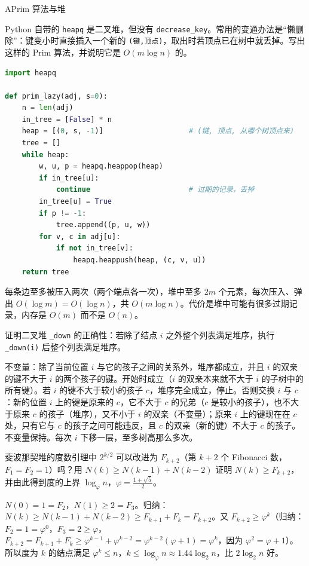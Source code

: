 \begin{exercises}{A}{Prim 算法与堆}
\item\label{ex:mst-prim:A1} Python 自带的 \texttt{heapq} 是二叉堆，但没有 \texttt{decrease\_key}。常用的变通办法是“懒删除”：键变小时直接插入一个新的 \texttt{(键,顶点)}，取出时若顶点已在树中就丢掉。写出这样的 Prim 算法，并说明它是 $O(m\log n)$ 的。
\begin{solution}
\begin{lstlisting}[language=Python]
import heapq

def prim_lazy(adj, s=0):
    n = len(adj)
    in_tree = [False] * n
    heap = [(0, s, -1)]                    # (键, 顶点, 从哪个树顶点来)
    tree = []
    while heap:
        w, u, p = heapq.heappop(heap)
        if in_tree[u]:
            continue                       # 过期的记录，丢掉
        in_tree[u] = True
        if p != -1:
            tree.append((p, u, w))
        for v, c in adj[u]:
            if not in_tree[v]:
                heapq.heappush(heap, (c, v, u))
    return tree
\end{lstlisting}
每条边至多被压入两次（两个端点各一次），堆中至多 $2m$ 个元素，每次压入、弹出 $O(\log m)=O(\log n)$，共 $O(m\log n)$。代价是堆中可能有很多过期记录，内存是 $O(m)$ 而不是 $O(n)$。
\end{solution}

\item\label{ex:mst-prim:A2} 证明二叉堆 \texttt{\_down} 的正确性：若除了结点 $i$ 之外整个列表满足堆序，执行 \texttt{\_down(i)} 后整个列表满足堆序。
\begin{solution}
不变量：除了当前位置 $i$ 与它的孩子之间的关系外，堆序都成立，并且 $i$ 的双亲的键不大于 $i$ 的两个孩子的键。开始时成立（$i$ 的双亲本来就不大于 $i$ 的子树中的所有键）。若 $i$ 的键不大于较小的孩子 $c$，堆序完全成立，停止。否则交换 $i$ 与 $c$：新的位置 $i$ 上的键是原来的 $c$，它不大于 $c$ 的兄弟（$c$ 是较小的孩子），也不大于原来 $c$ 的孩子（堆序），又不小于 $i$ 的双亲（不变量）；原来 $i$ 上的键现在在 $c$ 处，只有它与 $c$ 的孩子之间可能违反，且 $c$ 的双亲（新的键）不大于 $c$ 的孩子。不变量保持。每次 $i$ 下移一层，至多树高那么多次。
\end{solution}

\item\label{ex:mst-prim:A3} 斐波那契堆的度数引理中 $2^{k/2}$ 可以改进为 $F_{k+2}$（第 $k+2$ 个 Fibonacci 数，$F_1=F_2=1$）吗？用 $N(k)\geqslant N(k-1)+N(k-2)$ 证明 $N(k)\geqslant F_{k+2}$，并由此得到度的上界 $\log_\varphi n$，$\varphi=\frac{1+\sqrt5}2$。
\begin{solution}
$N(0)=1=F_2$，$N(1)\geqslant2=F_3$。归纳：$N(k)\geqslant N(k-1)+N(k-2)\geqslant F_{k+1}+F_k=F_{k+2}$。又 $F_{k+2}\geqslant\varphi^k$（归纳：$F_2=1=\varphi^0$，$F_3=2\geqslant\varphi$，$F_{k+2}=F_{k+1}+F_k\geqslant\varphi^{k-1}+\varphi^{k-2}=\varphi^{k-2}(\varphi+1)=\varphi^k$，因为 $\varphi^2=\varphi+1$）。所以度为 $k$ 的结点满足 $\varphi^k\leqslant n$，$k\leqslant\log_\varphi n\approx1.44\log_2n$，比 $2\log_2n$ 好。
\end{solution}


\end{exercises}
